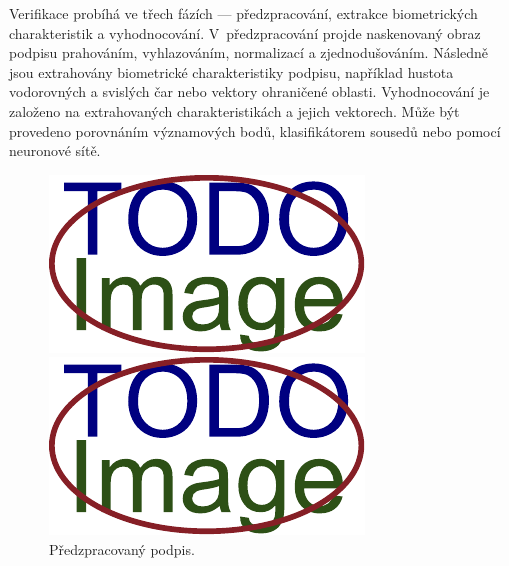 Verifikace probíhá ve třech fázích --- předzpracování, extrakce biometrických charakteristik a vyhodnocování. %
V~předzpracování projde naskenovaný obraz podpisu prahováním, vyhlazováním, normalizací a zjednodušováním.    %
Následně jsou extrahovány biometrické charakteristiky podpisu,                                                %
například hustota vodorovných a svislých čar nebo vektory ohraničené oblasti.                                 %
Vyhodnocování je založeno na extrahovaných charakteristikách a jejich vektorech.                              %
Může být provedeno porovnáním významových bodů, klasifikátorem sousedů nebo  pomocí neuronové sítě.\cite{RakRoman2008}%

\begin{figure}[h]
  \centering
  \begin{minipage}{0.3\textwidth}
    \centering
    \includegraphics[width=\textwidth]{obrazky-figures/placeholder.pdf}
    \caption{Předzpracovaný podpis.}
    \label{fig:first-image}
  \end{minipage}\hfill
  \begin{minipage}{0.3\textwidth}
    \centering
    \includegraphics[width=\textwidth]{obrazky-figures/placeholder.pdf}

\end{minipage}
\end{figure}
